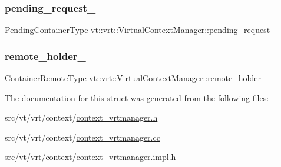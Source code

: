 \subsubsection{\texorpdfstring{pending\+\_\+request\+\_\+}{pending\_request\_}}
{\footnotesize\ttfamily \hyperlink{structvt_1_1vrt_1_1_virtual_context_manager_a85080f8107ed08c3a7fdd8114c724ce2}{Pending\+Container\+Type} vt\+::vrt\+::\+Virtual\+Context\+Manager\+::pending\+\_\+request\+\_\+\hspace{0.3cm}{\ttfamily [private]}}

\mbox{\label{structvt_1_1vrt_1_1_virtual_context_manager_a27aaad47bba7196b28b9246d6d00a345}} 
\subsubsection{\texorpdfstring{remote\+\_\+holder\+\_\+}{remote\_holder\_}}
{\footnotesize\ttfamily \hyperlink{structvt_1_1vrt_1_1_virtual_context_manager_aa0314e4b3f1b39a531c7ba5b630fc72e}{Container\+Remote\+Type} vt\+::vrt\+::\+Virtual\+Context\+Manager\+::remote\+\_\+holder\+\_\+\hspace{0.3cm}{\ttfamily [private]}}



The documentation for this struct was generated from the following files\+:\begin{DoxyCompactItemize}
\item 
src/vt/vrt/context/\hyperlink{context__vrtmanager_8h}{context\+\_\+vrtmanager.\+h}\item 
src/vt/vrt/context/\hyperlink{context__vrtmanager_8cc}{context\+\_\+vrtmanager.\+cc}\item 
src/vt/vrt/context/\hyperlink{context__vrtmanager_8impl_8h}{context\+\_\+vrtmanager.\+impl.\+h}\end{DoxyCompactItemize}
